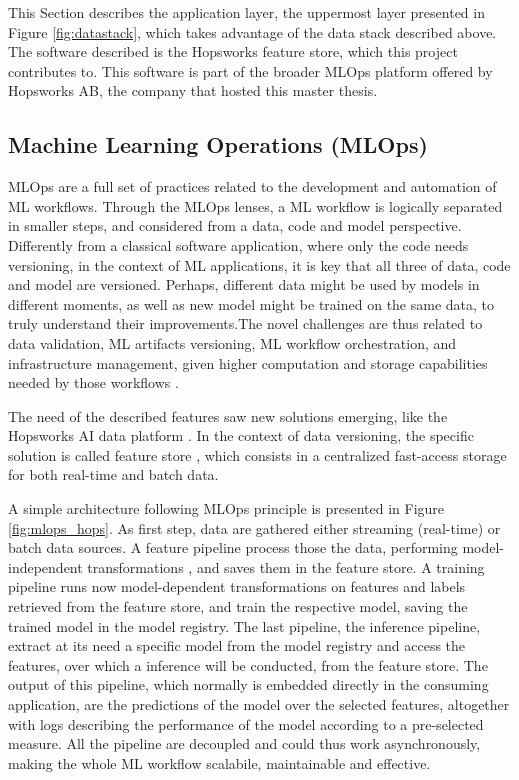 This Section describes the application layer, the uppermost layer presented in Figure \ref{fig:datastack}, which takes advantage of the data stack described above. The software described is the Hopsworks feature store, which this project contributes to. This software is part of the broader \gls{MLOps} platform offered by Hopsworks AB, the company that hosted this master thesis.


\subsection{Machine Learning Operations (MLOps)}
\label{subsec:back_mlops}

\gls{MLOps} are a full set of practices related to the development and automation of \gls{ML} workflows. Through the \gls{MLOps} lenses, a \gls{ML} workflow is logically separated in smaller steps, and considered from a data, code and model perspective. Differently from a classical software application, where only the code needs versioning, in the context of \gls{ML} applications, it is key that all three of data, code and model are versioned. Perhaps, different data might be used by models in different moments, as well as new model might be trained on the same data, to truly understand their improvements.The novel challenges are thus related to data validation, \gls{ML} artifacts versioning, \gls{ML} workflow orchestration, and infrastructure management, given higher computation and storage capabilities needed by those workflows \cite{SurgeAI2024,PDFBigData2024}.

The need of the described features saw new solutions emerging, like the Hopsworks AI data platform \cite{HopsworksRealtimeAI}. In the context of data versioning, the specific solution is called feature store \cite{MeetMichelangeloUbers2017}, which consists in a centralized fast-access storage for both real-time and batch data.

A simple architecture following \gls{MLOps} principle is presented in Figure \ref{fig:mlops_hops}. As first step, data are gathered either streaming (real-time) or batch data sources. A feature pipeline process those the data, performing model-independent transformations \cite{BigDictionaryMLOps2024}, and saves them in the feature store. A training pipeline runs now model-dependent transformations on features and labels retrieved from the feature store, and train the respective model, saving the trained model in the model registry. The last pipeline, the inference pipeline, extract at its need a specific model from the model registry and access the features, over which a inference will be conducted, from the feature store. The output of this pipeline, which normally is embedded directly in the consuming application, are the predictions of the model over the selected features, altogether with logs describing the performance of the model according to a pre-selected measure. All the pipeline are decoupled and could thus work asynchronously, making the whole \gls{ML} workflow scalabile, maintainable and effective.

